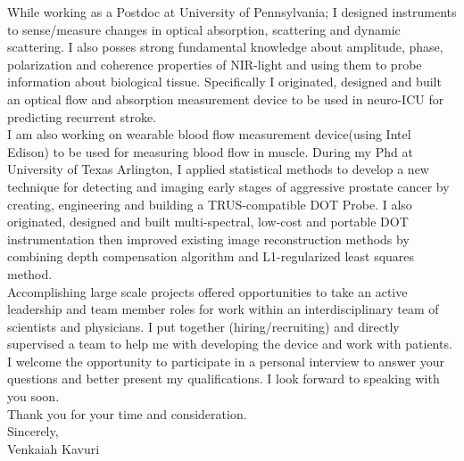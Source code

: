 \documentclass{my_cv}
\begin{document}
While working as a Postdoc at University of Pennsylvania; I designed instruments to sense/measure changes in optical absorption, scattering and dynamic scattering. I also posses strong fundamental knowledge about amplitude, phase, polarization and coherence properties of NIR-light and using them to probe information about biological tissue. Specifically I originated, designed and built an optical flow and absorption measurement device to be used in neuro-ICU for predicting recurrent stroke. \\
I am also working on wearable blood flow measurement device(using Intel Edison) to be used for measuring blood flow in muscle. During my Phd at University of Texas Arlington, I applied statistical methods to develop a new technique for detecting and imaging early stages of aggressive prostate cancer by creating, engineering and building a TRUS-compatible DOT Probe. I also originated, designed and built multi-spectral, low-cost and portable DOT instrumentation then improved existing image reconstruction methods by combining depth compensation algorithm and L1-regularized least squares method.\\
\vspace{2mm} 
Accomplishing large scale projects offered opportunities to take an active leadership and team member roles for work within an interdisciplinary team of scientists and physicians. I put together (hiring/recruiting) and directly supervised a team to help me with developing the device and work with patients. I welcome the opportunity to participate in a personal interview to answer your questions and better present my qualifications. I look forward to speaking with you soon.\\
\vspace{2mm} 
Thank you for your time and consideration.\\
\vspace{10mm} 
Sincerely,\\

\vspace{5mm} 
Venkaiah Kavuri\\
\end{document}
